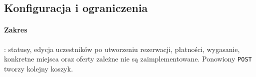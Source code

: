 \subsection{Konfiguracja i ograniczenia}


\paragraph{Zakres}: statusy, edycja uczestników po utworzeniu rezerwacji, płatności,
    wygasanie, konkretne miejsca oraz oferty
    zależne nie są zaimplementowane. Ponowiony \texttt{POST} tworzy kolejny koszyk.
